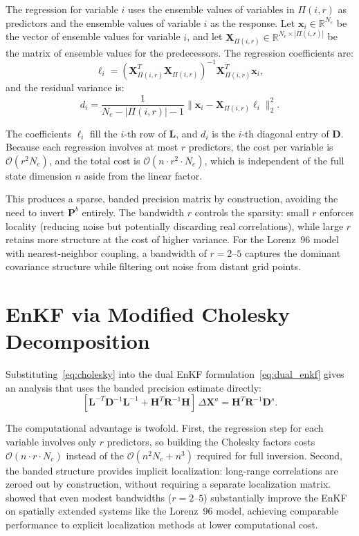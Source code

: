 The regression for variable $i$ uses the ensemble values of variables in $\Pi(i, r)$ as predictors and the ensemble values of variable $i$ as the response. Let $\mathbf{x}_i \in \mathbb{R}^{N_e}$ be the vector of ensemble values for variable $i$, and let $\mathbf{X}_{\Pi(i,r)} \in \mathbb{R}^{N_e \times |\Pi(i,r)|}$ be the matrix of ensemble values for the predecessors. The regression coefficients are:
\begin{equation}
\label{eq:cholesky_regression}
\boldsymbol{\ell}_i = (\mathbf{X}_{\Pi(i,r)}^T \mathbf{X}_{\Pi(i,r)})^{-1} \mathbf{X}_{\Pi(i,r)}^T \mathbf{x}_i,
\end{equation}
and the residual variance is:
\begin{equation}
\label{eq:cholesky_residual}
d_i = \frac{1}{N_e - |\Pi(i,r)| - 1} \|\mathbf{x}_i - \mathbf{X}_{\Pi(i,r)} \boldsymbol{\ell}_i\|_2^2.
\end{equation}

The coefficients $\boldsymbol{\ell}_i$ fill the $i$-th row of $\mathbf{L}$, and $d_i$ is the $i$-th diagonal entry of $\mathbf{D}$. Because each regression involves at most $r$ predictors, the cost per variable is $\mathcal{O}(r^2 N_e)$, and the total cost is $\mathcal{O}(n \cdot r^2 \cdot N_e)$, which is independent of the full state dimension $n$ aside from the linear factor.

This produces a sparse, banded precision matrix by construction, avoiding the need to invert $\mathbf{P}^b$ entirely. The bandwidth $r$ controls the sparsity: small $r$ enforces locality (reducing noise but potentially discarding real correlations), while large $r$ retains more structure at the cost of higher variance. For the Lorenz~96 model with nearest-neighbor coupling, a bandwidth of $r = 2$--$5$ captures the dominant covariance structure while filtering out noise from distant grid points.

\section{EnKF via Modified Cholesky Decomposition}
\label{sec:enkf_cholesky}

Substituting~\eqref{eq:cholesky} into the dual EnKF formulation~\eqref{eq:dual_enkf} gives an analysis that uses the banded precision estimate directly:
\begin{equation}
\label{eq:enkf_cholesky_system}
[\mathbf{L}^{-T} \mathbf{D}^{-1} \mathbf{L}^{-1} + \mathbf{H}^T\mathbf{R}^{-1}\mathbf{H}] \, \Delta\mathbf{X}^a = \mathbf{H}^T\mathbf{R}^{-1}\mathbf{D}^s.
\end{equation}

The computational advantage is twofold. First, the regression step for each variable involves only $r$ predictors, so building the Cholesky factors costs $\mathcal{O}(n \cdot r \cdot N_e)$ instead of the $\mathcal{O}(n^2 N_e + n^3)$ required for full inversion. Second, the banded structure provides implicit localization: long-range correlations are zeroed out by construction, without requiring a separate localization matrix. \citep{nino2018ensemble} showed that even modest bandwidths ($r = 2$--$5$) substantially improve the EnKF on spatially extended systems like the Lorenz~96 model, achieving comparable performance to explicit localization methods at lower computational cost.
